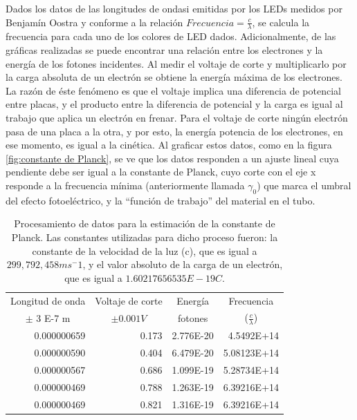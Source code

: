 \documentclass[%
 reprint,
 amsmath,amssymb,
 aps,
]{revtex4-1}
\begin{document}
Dados los datos de las longitudes de ondasi emitidas por los LEDs medidos por Benjamín Oostra y conforme a la relación $Frecuencia = \frac{c}{\lambda}$, se calcula la frecuencia para cada uno de los colores de LED dados. Adicionalmente, de las gráficas realizadas se puede encontrar una relación entre los electrones y la energía de los fotones incidentes. Al medir el voltaje de corte y multiplicarlo por la carga absoluta de un electrón se obtiene la energía máxima de los electrones. La razón de éste fenómeno es que el voltaje implica una diferencia de potencial entre placas, y el producto entre la diferencia de potencial y la carga es igual al trabajo que aplica un electrón en frenar. Para el voltaje de corte ningún electrón pasa de una placa a la otra, y por esto, la energía potencia de los electrones, en ese momento, es igual a la cinética. Al graficar estos datos, como en la figura \ref{fig:constante de Planck}, se ve que los datos responden a un ajuste lineal cuya pendiente debe ser igual a la constante de Planck, cuyo corte con el eje x responde a la frecuencia mínima (anteriormente llamada $\gamma_0$) que marca el umbral del efecto fotoeléctrico, y la “función de trabajo” del material en el tubo. 

\begin{table}[H]
  \centering
  \caption{Procesamiento de datos para la estimación de la constante de Planck. Las constantes utilizadas para dicho proceso fueron: la constante de la velocidad de la luz (c), que es igual a $299,792,458 ms^-1$, y el valor absoluto de la carga de un electrón, que es igual a $1.60217656535E-19 C$.}
    \begin{tabular}{|r|r|r|r|}
    \hline
    \multicolumn{1}{|c|}{Longitud de onda} & \multicolumn{1}{c|}{Voltaje de corte} & \multicolumn{1}{c|}{Energía} & \multicolumn{1}{c|}{Frecuencia} \\
    \multicolumn{1}{|c|}{$\pm$ 3 E-7 m} & \multicolumn{1}{c|}{$\pm 0.001 V$} & \multicolumn{1}{c|}{fotones} & \multicolumn{1}{c|}{ ($\frac{c}{\lambda}$)} \\
    \hline
    0.000000659 & 0.173 & 2.776E-20 & 4.5492E+14 \\
    0.000000590 & 0.404 & 6.479E-20 & 5.08123E+14 \\
    0.000000567 & 0.686 & 1.099E-19 & 5.28734E+14 \\
    0.000000469 & 0.788 & 1.263E-19 & 6.39216E+14 \\
    0.000000469 & 0.821 & 1.316E-19 & 6.39216E+14 \\
    \hline
    \end{tabular}
  \label{tab:constante de Planck}
\end{table}
\end{document}
